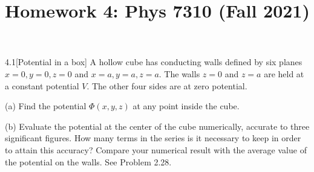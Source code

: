 \documentclass[12pt]{article}
\title{Homework 4: Phys 7310 (Fall 2021)}
\begin{document}
\maketitle
\begin{problem}{4.1}[Potential in a box]
A hollow cube has conducting walls defined by six planes $x=0,y=0,z=0$ and
$x=a,y=a,z=a$. The walls $z=0$ and $z=a$ are held at a constant potential $V$.
The other four sides are at zero potential.

(a) Find the potential $\Phi(x,y,z)$ at any point inside the cube.

(b) Evaluate the potential at the center of the cube numerically, accurate to
three significant figures. How many terms in the series is it necessary to keep
in order to attain this accuracy? Compare your numerical result with the average
value of the potential on the walls. See Problem 2.28.


\end{problem}
\end{document}
